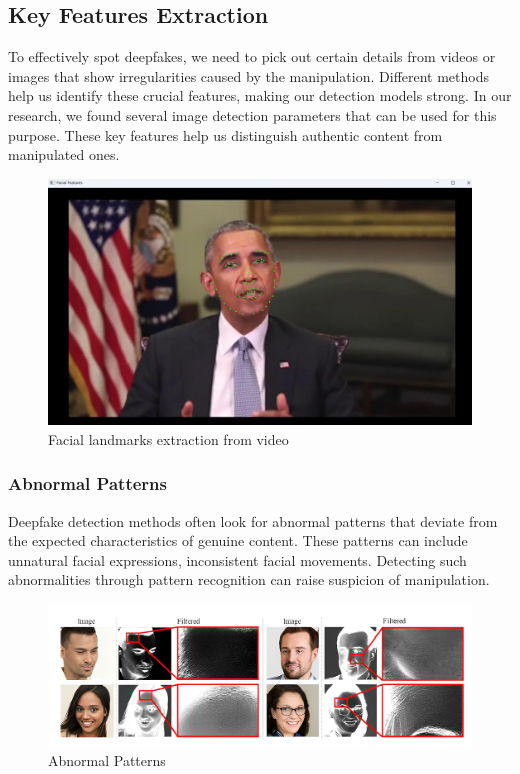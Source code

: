 \subsection{Key Features Extraction}

To effectively spot deepfakes, we need to pick out certain details from videos or images that show irregularities caused by the manipulation. Different methods help us identify these crucial features, making our detection models strong. In our research, we found several image detection parameters that can be used for this purpose. These key features help us distinguish authentic content from manipulated ones.
\begin{figure}[htbp]
    \centering
    \includegraphics[width= 5in ]{img/featureshighlight.jpg}
    \caption{{Facial landmarks extraction from video}}
\end{figure}
\subsubsection{Abnormal Patterns}

Deepfake detection methods often look for abnormal patterns that deviate from the expected characteristics of genuine content. These patterns can include unnatural facial expressions, inconsistent facial movements. Detecting such abnormalities through pattern recognition can raise suspicion of manipulation.
\begin{figure}[htbp]
    \centering
    \includegraphics[width=5in]{img/abnormal_pattern.png}
    \caption{{Abnormal Patterns}}
\end{figure}

